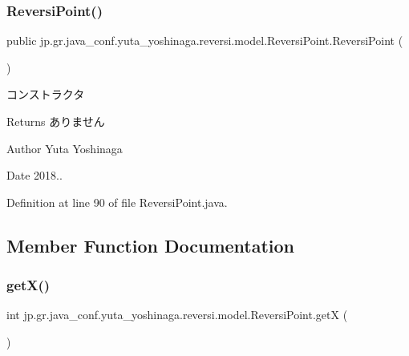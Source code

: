 \subsubsection{\texorpdfstring{Reversi\+Point()}{ReversiPoint()}}
{\footnotesize\ttfamily public jp.\+gr.\+java\+\_\+conf.\+yuta\+\_\+yoshinaga.\+reversi.\+model.\+Reversi\+Point.\+Reversi\+Point (\begin{DoxyParamCaption}{ }\end{DoxyParamCaption})}



コンストラクタ 

\begin{DoxyReturn}{Returns}
ありません 
\end{DoxyReturn}
\begin{DoxyAuthor}{Author}
Yuta Yoshinaga 
\end{DoxyAuthor}
\begin{DoxyDate}{Date}
2018.. 
\end{DoxyDate}


Definition at line 90 of file Reversi\+Point.\+java.



\subsection{Member Function Documentation}
\mbox{\label{classjp_1_1gr_1_1java__conf_1_1yuta__yoshinaga_1_1reversi_1_1model_1_1_reversi_point_ae95551c470eb4dd9dd21547fa479aee9}} 
\subsubsection{\texorpdfstring{get\+X()}{getX()}}
{\footnotesize\ttfamily int jp.\+gr.\+java\+\_\+conf.\+yuta\+\_\+yoshinaga.\+reversi.\+model.\+Reversi\+Point.\+getX (\begin{DoxyParamCaption}{ }\end{DoxyParamCaption})}



